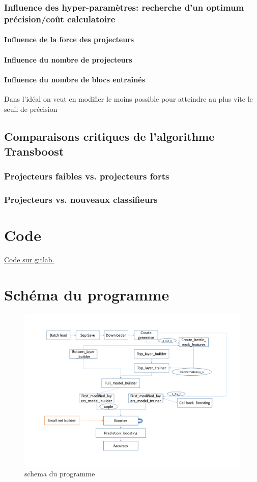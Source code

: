 \documentclass[11 pt]{article}
\begin{document}
\subsubsection{Influence des hyper-paramètres: recherche d'un optimum précision/coût calculatoire}
\paragraph{Influence de la force des projecteurs}
\paragraph{Influence du nombre de projecteurs}
\paragraph{Influence du nombre de blocs entraînés}
Dans l’idéal on veut en modifier le moins possible pour atteindre au plus vite le seuil de précision

\subsection{Comparaisons critiques de l'algorithme Transboost}
\subsubsection{Projecteurs faibles vs. projecteurs forts}
\subsubsection{Projecteurs vs. nouveaux classifieurs}

\pagebreak

\begin{appendices}
  \section{Code}
    \href{https://gitlab.com/zlanderous/transboost}{Code sur gitlab.}

  \section{Schéma du programme}
  \begin{figure}[h]
    \includegraphics[width=\textwidth]{figTot.pdf}
    \caption{schema du programme}
    \label{figTot}
  \end{figure}
\end{appendices}
\end{document}
